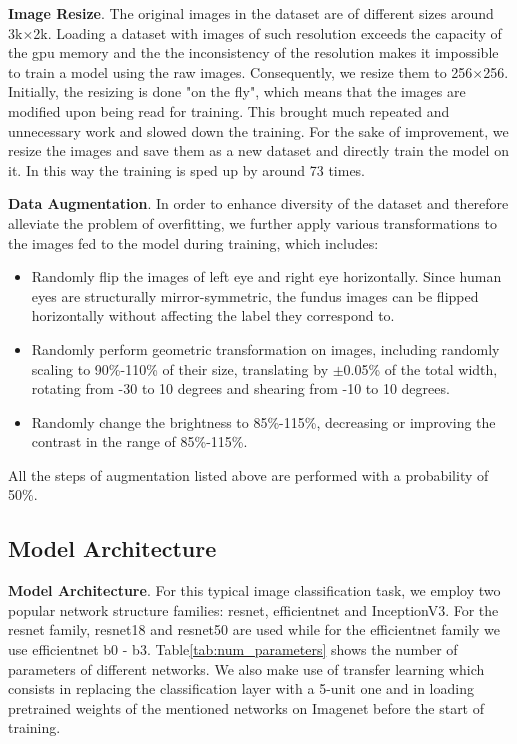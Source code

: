 \documentclass[../main.tex]{subfiles}
\begin{document}
\textbf{Image Resize}. The original images in the dataset are of different sizes around 3k$\times$2k. Loading a dataset with images of such resolution exceeds the capacity of the gpu memory and the the inconsistency of the resolution makes it impossible to train a model using the raw images. Consequently, we resize them to 256$\times$256. Initially, the resizing is done "on the fly", which means that the images are modified upon being read for training. This brought much repeated and unnecessary work and slowed down the training. For the sake of improvement, we resize the images and save them as a new dataset and directly train the model on it. In this way the training is sped up by around 73 times.

\textbf{Data Augmentation}. In order to enhance diversity of the dataset and therefore alleviate the problem of overfitting, we further apply various transformations to the images fed to the model during training, which includes:
\begin{itemize}
  \item Randomly flip the images of left eye and right eye horizontally. Since human eyes are structurally mirror-symmetric, the fundus images can be flipped horizontally without affecting the label they correspond to.
  \item Randomly perform geometric transformation on images, including randomly scaling to 90\%-110\% of their size, translating by $\pm$0.05\% of the total width, rotating from -30 to 10 degrees and shearing from -10 to 10 degrees.
  \item Randomly change the brightness to 85\%-115\%, decreasing or improving the contrast in the range of 85\%-115\%.
\end{itemize}
All the steps of augmentation listed above are performed with a probability of 50\%.

\subsection{Model Architecture}
\textbf{Model Architecture}. For this typical image classification task, we employ two popular network structure families: resnet\cite{he_deep_2015}, efficientnet\cite{tan_efficientnet_2019} and InceptionV3\cite{szegedy_rethinking_2015}. For the resnet family, resnet18 and resnet50 are used while for the efficientnet family we use efficientnet b0 - b3. Table\ref{tab:num_parameters} shows the number of parameters of different networks. We also make use of transfer learning which consists in replacing the classification layer with a 5-unit one and in loading pretrained weights of the mentioned networks on Imagenet before the start of training. 
\end{document}
